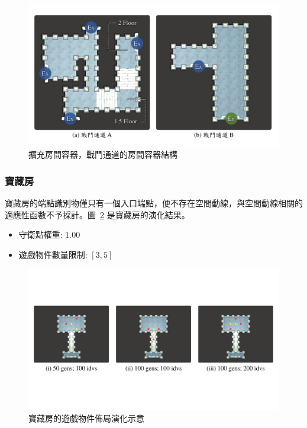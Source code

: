 \begin{figure}[!htb]
  \begin{center}
    \includegraphics[width=1.0\textwidth]{figures/roomtype-mainpath-extend.pdf}
    \caption{擴充房間容器，戰鬥通道的房間容器結構}
    \label{fig:roomtype-mainpath-extend}
  \end{center}
\end{figure}

\subsubsection{寶藏房}
\label{sssec:method-segments-appliedonvolumes-treasure}

寶藏房的端點識別物僅只有一個入口端點，便不存在空間動線，與空間動線相關的適應性函數不予採計。圖~\ref{fig:applied-ga-on-volume-treasure} 是寶藏房的演化結果。

\begin{itemize}
  \setlength\itemsep{-0.5em}
  \item 守衛點權重: $1.00$
  \item 遊戲物件數量限制: $[3, 5]$
\end{itemize}

\begin{figure}[H]
  \begin{center}
    \includegraphics[width=1.0\textwidth]{figures/applied-ga-on-volume-treasure.pdf}
    \caption{寶藏房的遊戲物件佈局演化示意} 
    \label{fig:applied-ga-on-volume-treasure}
  \end{center}
\end{figure}

